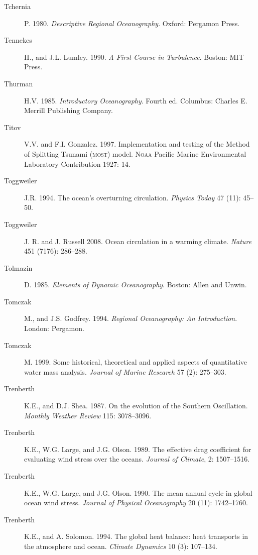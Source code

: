 \begin{description}
\item [Tchernia]P. 1980. \textit{Descriptive Regional Oceanography}. Oxford: Pergamon Press.

\item [Tennekes]H., and J.L. Lumley. 1990. \textit{A First Course in Turbulence}.  Boston: MIT Press.

\item [Thurman]H.V. 1985. \textit{Introductory Oceanography}. Fourth ed. Columbus: Charles E. Merrill Publishing Company.

\item [Titov]V.V. and F.I. Gonzalez. 1997. Implementation and testing of the Method of Splitting Tsunami (\textsc{most}) model. \textsc{Noaa} Pacific Marine Environmental Laboratory Contribution 1927: 14.

\item [Toggweiler]J.R. 1994. The ocean's overturning circulation. \textit{Physics Today} 47 (11): 45--50.

\item [Toggweiler]J. R. and J. Russell 2008. Ocean circulation in a warming climate. \textit{Nature} 451 (7176): 286--288.
	
\item [Tolmazin]D. 1985. \textit{Elements of Dynamic Oceanography}. Boston: Allen and Unwin.

\item [Tomczak]M., and J.S. Godfrey. 1994. \textit{Regional Oceanography: An Introduction}. London: Pergamon.

\item [Tomczak]M. 1999. Some historical, theoretical and applied aspects of quantitative water mass analysis. \textit{Journal of Marine Research} 57 (2): 275--303.

\item [Trenberth]K.E., and D.J. Shea. 1987. On the evolution of the Southern Oscillation. \textit{Monthly Weather Review} 115: 3078--3096.

\item [Trenberth]K.E., W.G. Large, and J.G. Olson. 1989. The effective drag coefficient for evaluating wind stress over the oceans. \textit{Journal of Climate}, 2:
1507--1516.

\item [Trenberth]K.E., W.G. Large, and J.G. Olson. 1990. The mean annual cycle
in global ocean wind stress. \textit{Journal of Physical Oceanography} 20 (11):
1742--1760.

\item [Trenberth]K.E., and A. Solomon. 1994. The global heat balance: heat
transports in the atmosphere and ocean. \textit{Climate Dynamics} 10 (3):
107--134.


\end{description}

